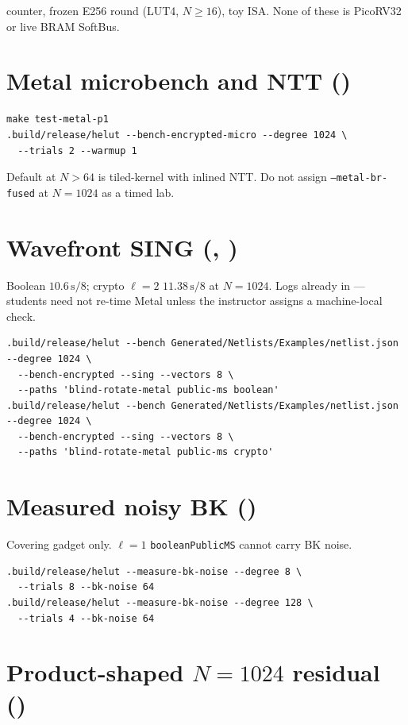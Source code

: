  counter,  frozen E256 round (LUT4, $N\ge 16$),
 toy ISA. None of these is PicoRV32 or live BRAM SoftBus.

\section{Metal microbench and NTT ()}

\begin{lstlisting}
make test-metal-p1
.build/release/helut --bench-encrypted-micro --degree 1024 \
  --trials 2 --warmup 1
\end{lstlisting}

Default at $N>64$ is tiled-kernel with inlined NTT.
Do not assign \texttt{--metal-br-fused} at $N=1024$ as a timed lab.

\section{Wavefront SING (, )}

Boolean $10.6\,\mathrm{s}/8$; crypto $\ell=2$ $11.38\,\mathrm{s}/8$ at $N=1024$.
Logs already in \corpus{logs/} --- students need not re-time Metal unless
the instructor assigns a machine-local check.

\begin{lstlisting}
.build/release/helut --bench Generated/Netlists/Examples/netlist.json --degree 1024 \
  --bench-encrypted --sing --vectors 8 \
  --paths 'blind-rotate-metal public-ms boolean'
.build/release/helut --bench Generated/Netlists/Examples/netlist.json --degree 1024 \
  --bench-encrypted --sing --vectors 8 \
  --paths 'blind-rotate-metal public-ms crypto'
\end{lstlisting}

\section{Measured noisy BK (\cid{22})}

Covering gadget only. $\ell=1$ \texttt{booleanPublicMS} cannot carry BK noise.

\begin{lstlisting}
.build/release/helut --measure-bk-noise --degree 8 \
  --trials 8 --bk-noise 64
.build/release/helut --measure-bk-noise --degree 128 \
  --trials 4 --bk-noise 64
\end{lstlisting}

\section{Product-shaped $N{=}1024$ residual ()}

